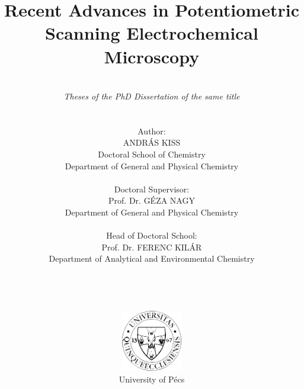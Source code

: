 \pagestyle{empty}

\title{\textbf{Recent Advances in Potentiometric Scanning Electrochemical Microscopy}}

\author{\\ \emph{Theses of the PhD Dissertation of the same title} \\ \\ \\ Author: \\ ANDRÁS KISS \\ Doctoral School of Chemistry \\ Department of General and Physical Chemistry \\ \\ Doctoral Supervisor: \\ Prof. Dr. GÉZA NAGY
\\ Department of General and Physical Chemistry \\
\\ Head of Doctoral School: \\
Prof. Dr. FERENC KILÁR\\
Department of Analytical and Environmental Chemistry \\
\\ \\ \\ \\
\includegraphics[width=0.2\textwidth]{img/pte_logo.eps} \\
University of Pécs}
\maketitle

\thispagestyle{empty}
\large
\setcounter{tocdepth}{4}
\thispagestyle{empty}
\thispagestyle{empty}
